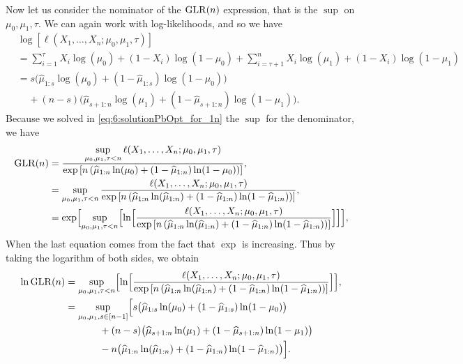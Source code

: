     Now let us consider the nominator of the $\mathrm{GLR}(n)$ expression, that is the $\sup$ on $\mu_0,\mu_1,\tau$.
    We can again work with log-likelihoods, and so we have
    \begin{align*}
        & \log \left[ \ell(X_1, \dots, X_n ; \mu_0,\mu_1,\tau) \right] \\
        &= \sum_{i=1}^{\tau} X_i \log(\mu_0) + (1-X_i) \log(1-\mu_0) + \sum_{i=\tau+1}^n X_i \log(\mu_1) + (1-X_i) \log(1-\mu_1) \\
        &= s \bigl( \widehat{\mu}_{1:s} \log(\mu_0) + (1 - \widehat{\mu}_{1:s}) \log(1-\mu_0) \bigr) \\
        & \;\;\;\; + (n-s) \bigl( \widehat{\mu}_{s+1:n} \log(\mu_1) + (1 - \widehat{\mu}_{s+1:n}) \log(1-\mu_1) \bigr).
    \end{align*}
    Because we solved in \eqref{eq:6:solutionPbOpt_for_1n} the $\sup$ for the denominator,
    we have
    \begin{align*}
        \mathrm{GLR}(n)
        &= \frac{\sup\limits_{\mu_0,\mu_1,\tau < n}\ell(X_1, \dots, X_n ; \mu_0,\mu_1,\tau)}{ \exp\left[ n \left( \widehat{\mu}_{1:n} \ln(\mu_0) + (1 - \widehat{\mu}_{1:n}) \ln(1-\mu_0) \right) \right] }, \\
        &= \sup\limits_{\mu_0,\mu_1,\tau < n} \frac{\ell(X_1, \dots, X_n ; \mu_0,\mu_1,\tau)}{ \exp\left[ n \left( \widehat{\mu}_{1:n} \ln(\widehat{\mu}_{1:n}) + (1 - \widehat{\mu}_{1:n}) \ln(1-\widehat{\mu}_{1:n}) \right) \right] }, \\
        &= \exp \Bigl[ \sup\limits_{\mu_0,\mu_1,\tau < n} \Bigl[ \ln\Bigl[ \frac{\ell(X_1, \dots, X_n ; \mu_0,\mu_1,\tau)}{ \exp\left[ n \left( \widehat{\mu}_{1:n} \ln(\widehat{\mu}_{1:n}) + (1 - \widehat{\mu}_{1:n}) \ln(1-\widehat{\mu}_{1:n}) \right) \right] } \Bigr] \Bigr] \Bigr],
    \end{align*}
    When the last equation comes from the fact that $\exp$ is increasing.
    Thus by taking the logarithm of both sides, we obtain
    \begin{align*}
        \ln \mathrm{GLR}(n)
        &= \sup\limits_{\mu_0,\mu_1,\tau < n} \Bigl[ \ln\Bigl[ \frac{\ell(X_1, \dots, X_n ; \mu_0,\mu_1,\tau)}{ \exp\left[ n \left( \widehat{\mu}_{1:n} \ln(\widehat{\mu}_{1:n}) + (1 - \widehat{\mu}_{1:n}) \ln(1-\widehat{\mu}_{1:n}) \right) \right] } \Bigr] \Bigr],  \\
        &= \sup\limits_{\mu_0,\mu_1, s \in [n-1]} \Bigl[
            s \bigl( \widehat{\mu}_{1:s} \ln(\mu_0) + (1 - \widehat{\mu}_{1:s}) \ln(1-\mu_0) \bigr) \\
            & \hspace{35pt} + (n-s) \bigl( \widehat{\mu}_{s+1:n} \ln(\mu_1) + (1 - \widehat{\mu}_{s+1:n}) \ln(1-\mu_1) \bigr) \\
            & \hspace{35pt} - n \bigl( \widehat{\mu}_{1:n} \ln(\widehat{\mu}_{1:n}) + (1 - \widehat{\mu}_{1:n}) \ln(1-\widehat{\mu}_{1:n}) \bigr)
        \Bigr].
    \end{align*}

